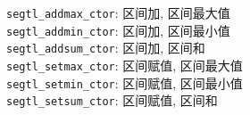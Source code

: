 \begin{multicols}{2}
    \verb|segtl_addmax_ctor|: 区间加, 区间最大值 \\
    \verb|segtl_addmin_ctor|: 区间加, 区间最小值 \\
    \verb|segtl_addsum_ctor|: 区间加, 区间和 \\
    \verb|segtl_setmax_ctor|: 区间赋值, 区间最大值 \\
    \verb|segtl_setmin_ctor|: 区间赋值, 区间最小值 \\
    \verb|segtl_setsum_ctor|: 区间赋值, 区间和
\end{multicols}